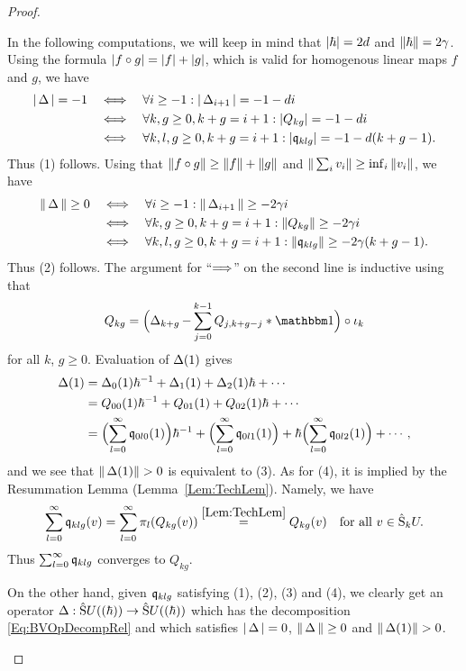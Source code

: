 \documentclass[\MainFolder/Text.tex]{subfiles}
\begin{document}
\begin{proof}
\begin{ProofList}
In the following computations, we will keep in mind that $|\hbar| = 2d$ and $\| \hbar \| = 2\gamma$. Using the formula $|f \circ g| = |f| + |g|$, which is valid for homogenous linear maps $f$ and $g$, we have 
\begin{align*}
|\operatorname{\Delta}|=-1 &\quad\Longleftrightarrow\quad\forall i\ge -1: |\operatorname{\Delta}_{i+1}| = -1 - d i \\
&\quad\Longleftrightarrow\quad\forall k, g \ge 0, k + g = i+1: |Q_{kg}| = - 1 - di \\
&\quad\Longleftrightarrow\quad\forall k, l, g \ge 0, k+g=i+1: |\mathfrak{q}_{klg}| = - 1 - d(k+g-1).
\end{align*}
Thus (1) follows. Using that $\| f\circ g \| \ge \| f \| + \| g \|$ and $\| \sum_i v_i \|\ge \inf_i \| v_i \|$, we have
\begin{align*}
\| \operatorname{\Delta} \|\ge 0 &\quad\Longleftrightarrow\quad\forall i\ge -1: \| \operatorname{\Delta}_{i+1} \| \ge -2\gamma i \\
 &\quad\Longleftrightarrow\quad\forall k, g \ge 0, k+g=i+1: \| Q_{kg} \| \ge -2\gamma i \\
 &\quad\Longleftrightarrow\quad\forall k, l, g \ge 0, k+g=i+1: \| \mathfrak{q}_{klg} \| \ge -2\gamma (k+g-1).
\end{align*}
Thus (2) follows. The argument for ``$\Longrightarrow$'' on the second line is inductive using that
\[ Q_{kg} = \Bigl(\BVOp_{k+g} - \sum_{j=0}^{k-1} Q_{j, k+g - j} \Star \Id\Bigr)\circ\iota_k \]
for all $k$, $g\ge 0$. Evaluation of $\operatorname{\Delta}(1)$ gives
\begin{align*}
\operatorname{\Delta}(1)&=\operatorname{\Delta}_0(1)\hbar^{-1}+\operatorname{\Delta}_1(1)+\operatorname{\Delta}_2(1)\hbar+\dotsb \\
        &=Q_{00}(1)\hbar^{-1}+Q_{01}(1)+Q_{02}(1)\hbar+\dotsb \\
& = \Bigl(\sum_{l=0}^\infty \mathfrak{q}_{0l0}(1) \Bigr)\hbar^{-1} +  \Bigl(\sum_{l=0}^\infty \mathfrak{q}_{0l1}(1)\Bigr) + \hbar\Bigl(\sum_{l=0}^\infty \mathfrak{q}_{0l2}(1)\Bigr) + \dotsb,
\end{align*}
and we see that $\Norm{\BVOp(1)}>0$ is equivalent to (3). As for (4), it is implied by the Resummation Lemma (Lemma~\ref{Lem:TechLem}). Namely, we have 
\[ \sum_{l=0}^\infty \mathfrak{q}_{klg}(v) = \sum_{l=0}^\infty \pi_l(Q_{kg}(v)) \overset{\ref{Lem:TechLem}}{=} Q_{kg}(v)\quad \text{for all }v\in \hat{\mathrm{S}}_k U. \]
Thus $\sum_{l=0}^\infty \mathfrak{q}_{klg}$ converges to $Q_{kg}$.

On the other hand, given $\mathfrak{q}_{klg}$ satisfying (1), (2), (3) and (4), we clearly get an operator $\operatorname{\Delta}: \hat{\mathrm{S}}U((\hbar))\rightarrow\hat{\mathrm{S}}U((\hbar))$ which has the decomposition \eqref{Eq:BVOpDecompRel} and which satisfies $|\operatorname{\Delta}| = 0$, $\| \operatorname{\Delta} \|\ge 0$ and $\Norm{\BVOp(1)}>0$.


\end{ProofList}
\end{proof}
\end{document}
